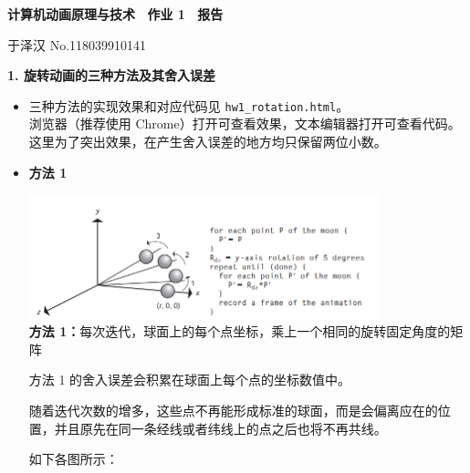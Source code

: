 \documentclass[a4paper, 12pt]{article}
\begin{document}
\begin{center}
{\bfseries {计算机动画原理与技术 ~作业 1 ~报告}}

\vspace{0.5\baselineskip}

{ \kaishu 于泽汉 \hspace{1em} \textsf{No.118039910141}}
\end{center}


\textbf{1. 旋转动画的三种方法及其舍入误差}


\begin{itemize}[leftmargin=2em, label={}]

\item 三种方法的实现效果和对应代码见 \texttt{hw1\_rotation.html}。\\
浏览器（推荐使用 Chrome）打开可查看效果，文本编辑器打开可查看代码。\\
这里为了突出效果，在产生舍入误差的地方均只保留两位小数。


\item \textbf{方法 1}

\begin{center}
\includegraphics [width=0.8\textwidth] {./images/method_1.png}\\
\textbf{方法 1：}每次迭代，球面上的每个点坐标，乘上一个相同的旋转固定角度的矩阵
\end{center}

方法 1 的舍入误差会积累在球面上每个点的坐标数值中。

随着迭代次数的增多，这些点不再能形成标准的球面，而是会偏离应在的位置，并且原先在同一条经线或者纬线上的点之后也将不再共线。

如下各图所示：


\end{itemize}
\end{document}
